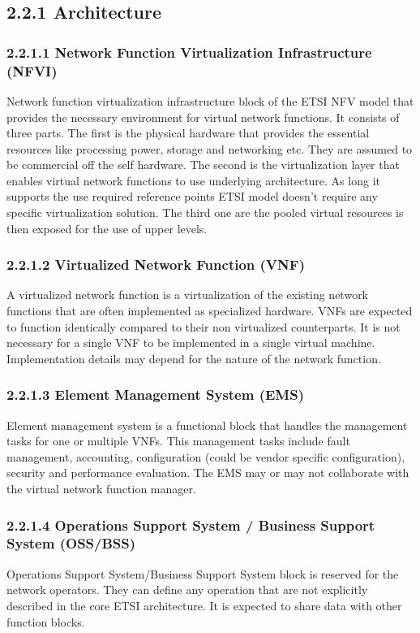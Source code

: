 \documentclass[12pt,oneandhalf,chaparabic,ceng,ms,eng,oneside,pntc]{gsufbe}
\begin{document}
\subsection[Architecture]{2.2.1 Architecture}
\subsubsection[Network Function Virtualization Infrastructure (NFVI)]{2.2.1.1 Network Function Virtualization Infrastructure (NFVI)}
Network function virtualization infrastructure block of the ETSI NFV model that provides the necessary
environment for virtual network functions.  It consists of three parts.  The first is the physical hardware
that provides the essential resources like processing power, storage and networking etc.  They are
assumed to be commercial off the self hardware.  The second is the virtualization layer that enables
virtual network functions to use underlying architecture.  As long it supports the use required reference
points ETSI model doesn't require any specific virtualization solution.  The third one
are the pooled virtual resources is then exposed for the use of upper levels.

\subsubsection[Virtualized Network Function (VNF)]{2.2.1.2 Virtualized Network Function (VNF)}
A virtualized network function is a virtualization of the existing network functions that are often
implemented as specialized hardware.  VNFs are expected to function identically compared to their non 
virtualized counterparts.  It is not necessary for a single VNF to be implemented in a single virtual
machine.  Implementation details may depend for the nature of the network function.

\subsubsection[Element Management System (EMS)]{2.2.1.3 Element Management System (EMS)}
Element management system is a functional block that handles the management tasks for one or
multiple VNFs.  This management tasks include fault management, accounting, configuration (could be 
vendor specific configuration), security and performance evaluation.  The EMS may or may not collaborate
with the virtual network function manager.

\subsubsection[Operations Support System / Business Support System (OSS/BSS)]{2.2.1.4 Operations Support System / Business Support System (OSS/BSS)}
Operations Support System/Business Support System block is reserved for the network
operators.  They can define any operation that are not explicitly described in the core
ETSI architecture.  It is expected to share data with other function blocks.
\end{document}
